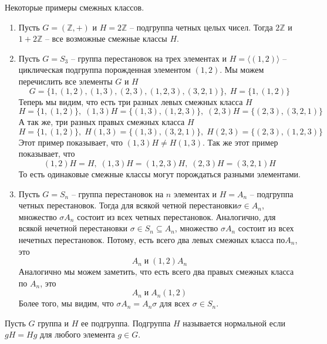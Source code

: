 \begin{examples}
Некоторые примеры смежных классов.
\begin{enumerate}
\item Пусть $G = (\mathbb Z, +)$ и $H = 2\mathbb Z$  -- подгруппа четных целых чисел.
Тогда $2\mathbb Z$ и $1 + 2\mathbb Z$ -- все возможные смежные классы $H$.

\item Пусть $G = S_3$ -- группа перестановок на трех элементах и $H = \langle (1, 2)\rangle$ -- циклическая подгруппа порожденная элементом $(1,2)$.
Мы можем перечислить все элементы $G$ и $H$
\[
G = \{1, (1,2), (1, 3), (2, 3), (1, 2, 3), (3, 2, 1)\},\; H = \{1, (1, 2)\}
\]
Теперь мы видим, что есть три разных левых смежных класса $H$
\[
H = \{1, (1, 2)\}, \;(1,3)H = \{(1, 3), (1, 2, 3)\},\;(2, 3)H = \{(2, 3), (3,2,1)\}
\]
А так же, три разных правых смежных класса $H$
\[
H =  \{1, (1, 2)\}, \; H(1, 3) = \{(1, 3), (3, 2, 1)\},\; H (2, 3) = \{(2, 3), (1, 2, 3)\}
\]
Этот пример показывает, что $(1, 3) H \neq H (1, 3)$.
Так же этот пример показывает, что
\[
(1, 2)H = H,\; (1, 3)H = (1, 2, 3)H,\; (2, 3)H = (3, 2, 1)H
\]
То есть одинаковые смежные классы могут порождаться разными элементами.

\item Пусть $G = S_n$ -- группа перестановок на $n$ элементах и $H = A_n$ -- подгруппа четных перестановок.
Тогда для всякой четной перестановки$\sigma\in A_n$, множество $\sigma A_n$ состоит из всех четных перестановок.
Аналогично, для всякой нечетной перестановки $\sigma\in S_n\subseteq A_n$, множество $\sigma A_n$ состоит из всех нечетных перестановок.
Потому, есть всего два левых смежных класса по$A_n$, это
\[
A_n\;\text{и}\;(1, 2) A_n
\]
Аналогично мы можем заметить, что есть всего два правых смежных класса по $A_n$, это
\[
A_n\;\text{и}\; A_n(1, 2)
\]
Более того, мы видим, что $\sigma A_n = A_n \sigma$ для всех $\sigma \in S_n$.
\end{enumerate}
\end{examples}

\begin{definition}
Пусть $G$ группа и $H$ ее подгруппа.
Подгруппа $H$ называется нормальной если $gH = Hg$ для любого элемента $g\in G$.
\end{definition}

